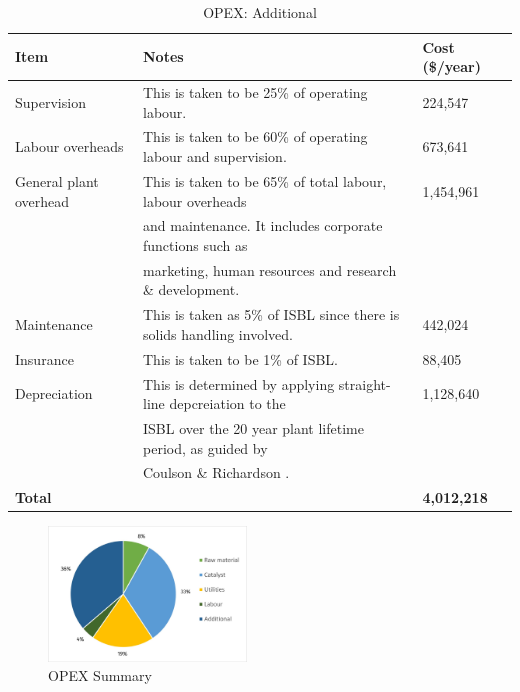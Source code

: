 \begin{table}[H]
\centering
\caption{OPEX: Additional}
\label{tab:opex-add}
\begin{tabular}{lll}
\toprule
\textbf{Item}          & \textbf{Notes}                                                          & \textbf{Cost (\$/year)} \\
\midrule
Supervision            & This is taken to be 25\% of operating labour.                           & 224,547                 \\
Labour overheads       & This is taken to be 60\% of operating labour and supervision.           & 673,641                 \\
General plant overhead & This is taken to be 65\% of total labour, labour overheads              & 1,454,961               \\
                       & and maintenance. It includes corporate functions such as                &                         \\
                       & marketing, human resources and research \& development.                 &                         \\
Maintenance            & This is taken as 5\% of ISBL since there is solids handling   involved. & 442,024                 \\
Insurance              & This is taken to be 1\% of ISBL.                                        & 88,405                  \\
Depreciation           & This is determined by applying straight-line depcreiation to the        & 1,128,640               \\
                       & ISBL over the 20 year plant lifetime period, as guided by               &                         \\
                       & Coulson \& Richardson \cite{sinnott_coulson_2005}.                                             &                         \\
\textbf{Total}         & \textbf{}                                                               & \textbf{4,012,218}
\\\bottomrule
\end{tabular}
\end{table}

\begin{figure}
    \caption{OPEX Summary}
    \label{fig:OPEXSummary}
    \includegraphics[width=0.47\textwidth]{chapters/6-economics/figures/OPEX_summary.jpg}
\end{figure}

